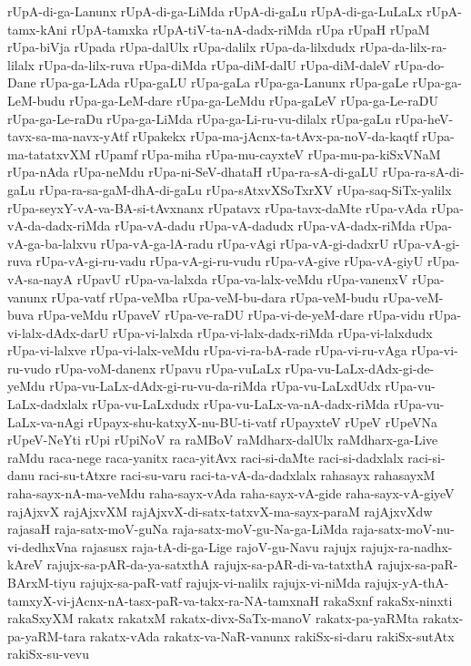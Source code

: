 {rUpA-di-ga-Lanunx
rUpA-di-ga-LiMda
rUpA-di-gaLu
rUpA-di-ga-LuLaLx
rUpA-tamx-kAni
rUpA-tamxka
rUpA-tiV-ta-nA-dadx-riMda
rUpa
rUpaH
rUpaM
rUpa-biVja
rUpada
rUpa-dalUlx
rUpa-dalilx
rUpa-da-lilxdudx
rUpa-da-lilx-ra-lilalx
rUpa-da-lilx-ruva
rUpa-diMda
rUpa-diM-dalU
rUpa-diM-daleV
rUpa-do-Dane
rUpa-ga-LAda
rUpa-gaLU
rUpa-gaLa
rUpa-ga-Lanunx
rUpa-gaLe
rUpa-ga-LeM-budu
rUpa-ga-LeM-dare
rUpa-ga-LeMdu
rUpa-gaLeV
rUpa-ga-Le-raDU
rUpa-ga-Le-raDu
rUpa-ga-LiMda
rUpa-ga-Li-ru-vu-dilalx
rUpa-gaLu
rUpa-heV-tavx-sa-ma-navx-yAtf
rUpakekx
rUpa-ma-jAcnx-ta-tAvx-pa-noV-da-kaqtf
rUpa-ma-tatatxvXM
rUpamf
rUpa-miha
rUpa-mu-cayxteV
rUpa-mu-pa-kiSxVNaM
rUpa-nAda
rUpa-neMdu
rUpa-ni-SeV-dhataH
rUpa-ra-sA-di-gaLU
rUpa-ra-sA-di-gaLu
rUpa-ra-sa-gaM-dhA-di-gaLu
rUpa-sAtxvXSoTxrXV
rUpa-saq-SiTx-yalilx
rUpa-seyxY-vA-va-BA-si-tAvxnanx
rUpatavx
rUpa-tavx-daMte
rUpa-vAda
rUpa-vA-da-dadx-riMda
rUpa-vA-dadu
rUpa-vA-dadudx
rUpa-vA-dadx-riMda
rUpa-vA-ga-ba-lalxvu
rUpa-vA-ga-lA-radu
rUpa-vAgi
rUpa-vA-gi-dadxrU
rUpa-vA-gi-ruva
rUpa-vA-gi-ru-vadu
rUpa-vA-gi-ru-vudu
rUpa-vA-give
rUpa-vA-giyU
rUpa-vA-sa-nayA
rUpavU
rUpa-va-lalxda
rUpa-va-lalx-veMdu
rUpa-vanenxV
rUpa-vanunx
rUpa-vatf
rUpa-veMba
rUpa-veM-bu-dara
rUpa-veM-budu
rUpa-veM-buva
rUpa-veMdu
rUpaveV
rUpa-ve-raDU
rUpa-vi-de-yeM-dare
rUpa-vidu
rUpa-vi-lalx-dAdx-darU
rUpa-vi-lalxda
rUpa-vi-lalx-dadx-riMda
rUpa-vi-lalxdudx
rUpa-vi-lalxve
rUpa-vi-lalx-veMdu
rUpa-vi-ra-bA-rade
rUpa-vi-ru-vAga
rUpa-vi-ru-vudo
rUpa-voM-danenx
rUpavu
rUpa-vuLaLx
rUpa-vu-LaLx-dAdx-gi-de-yeMdu
rUpa-vu-LaLx-dAdx-gi-ru-vu-da-riMda
rUpa-vu-LaLxdUdx
rUpa-vu-LaLx-dadxlalx
rUpa-vu-LaLxdudx
rUpa-vu-LaLx-va-nA-dadx-riMda
rUpa-vu-LaLx-va-nAgi
rUpayx-shu-katxyX-nu-BU-ti-vatf
rUpayxteV
rUpeV
rUpeVNa
rUpeV-NeYti
rUpi
rUpiNoV
ra
raMBoV
raMdharx-dalUlx
raMdharx-ga-Live
raMdu
raca-nege
raca-yanitx
raca-yitAvx
raci-si-daMte
raci-si-dadxlalx
raci-si-danu
raci-su-tAtxre
raci-su-varu
raci-ta-vA-da-dadxlalx
rahasayx
rahasayxM
raha-sayx-nA-ma-veMdu
raha-sayx-vAda
raha-sayx-vA-gide
raha-sayx-vA-giyeV
rajAjxvX
rajAjxvXM
rajAjxvX-di-satx-tatxvX-ma-sayx-paraM
rajAjxvXdw
rajasaH
raja-satx-moV-guNa
raja-satx-moV-gu-Na-ga-LiMda
raja-satx-moV-nu-vi-dedhxVna
rajasusx
raja-tA-di-ga-Lige
rajoV-gu-Navu
rajujx
rajujx-ra-nadhx-kAreV
rajujx-sa-pAR-da-ya-satxthA
rajujx-sa-pAR-di-va-tatxthA
rajujx-sa-paR-BArxM-tiyu
rajujx-sa-paR-vatf
rajujx-vi-nalilx
rajujx-vi-niMda
rajujx-yA-thA-tamxyX-vi-jAcnx-nA-tasx-paR-va-takx-ra-NA-tamxnaH
rakaSxnf
rakaSx-ninxti
rakaSxyXM
rakatx
rakatxM
rakatx-divx-SaTx-manoV
rakatx-pa-yaRMta
rakatx-pa-yaRM-tara
rakatx-vAda
rakatx-va-NaR-vanunx
rakiSx-si-daru
rakiSx-sutAtx
rakiSx-su-vevu
}
